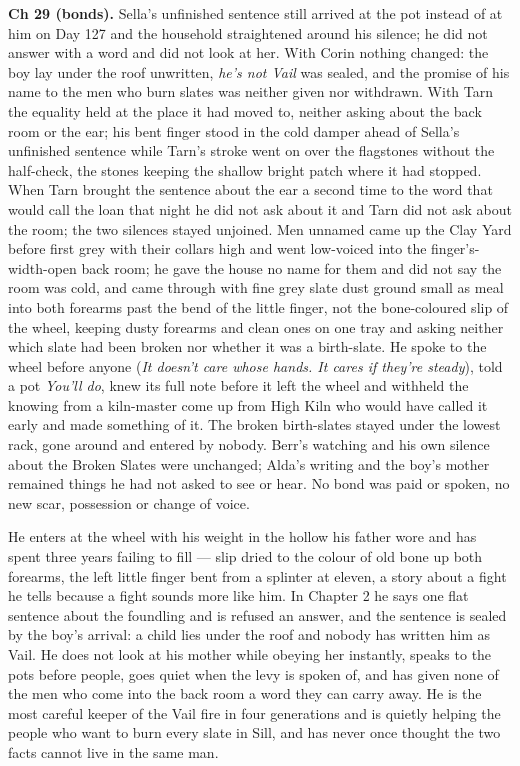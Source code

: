 \documentclass{design/chronicle}
\begin{document}
{\textbf{Ch 29 (bonds).} Sella’s unfinished sentence still arrived at the pot instead of at him on Day 127 and the household straightened around his silence; he did not answer with a word and did not look at her. With Corin nothing changed: the boy lay under the roof unwritten, \emph{he’s not Vail} was sealed, and the promise of his name to the men who burn slates was neither given nor withdrawn. With Tarn the equality held at the place it had moved to, neither asking about the back room or the ear; his bent finger stood in the cold damper ahead of Sella’s unfinished sentence while Tarn’s stroke went on over the flagstones without the half-check, the stones keeping the shallow bright patch where it had stopped. When Tarn brought the sentence about the ear a second time to the word that would call the loan that night he did not ask about it and Tarn did not ask about the room; the two silences stayed unjoined. Men unnamed came up the Clay Yard before first grey with their collars high and went low-voiced into the finger’s-width-open back room; he gave the house no name for them and did not say the room was cold, and came through with fine grey slate dust ground small as meal into both forearms past the bend of the little finger, not the bone-coloured slip of the wheel, keeping dusty forearms and clean ones on one tray and asking neither which slate had been broken nor whether it was a birth-slate. He spoke to the wheel before anyone (\emph{It doesn’t care whose hands. It cares if they’re steady}), told a pot \emph{You’ll do}, knew its full note before it left the wheel and withheld the knowing from a kiln-master come up from High Kiln who would have called it early and made something of it. The broken birth-slates stayed under the lowest rack, gone around and entered by nobody. Berr’s watching and his own silence about the Broken Slates were unchanged; Alda’s writing and the boy’s mother remained things he had not asked to see or hear. No bond was paid or spoken, no new scar, possession or change of voice.

He enters at the wheel with his weight in the hollow his father wore and has spent three years failing to fill --- slip dried to the colour of old bone up both forearms, the left little finger bent from a splinter at eleven, a story about a fight he tells because a fight sounds more like him. In Chapter 2 he says one flat sentence about the foundling and is refused an answer, and the sentence is sealed by the boy’s arrival: a child lies under the roof and nobody has written him as Vail. He does not look at his mother while obeying her instantly, speaks to the pots before people, goes quiet when the levy is spoken of, and has given none of the men who come into the back room a word they can carry away. He is the most careful keeper of the Vail fire in four generations and is quietly helping the people who want to burn every slate in Sill, and has never once thought the two facts cannot live in the same man.

}
\end{document}
